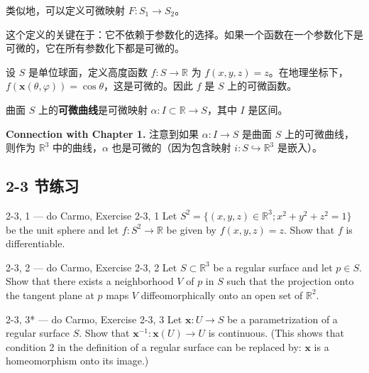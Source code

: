 类似地，可以定义可微映射 $F: S_1 \to S_2$。

\begin{Remark}
这个定义的关键在于：它不依赖于参数化的选择。如果一个函数在一个参数化下是可微的，它在所有参数化下都是可微的。
\end{Remark}

\begin{Example}[高度函数]\label{ex:height-function}
设 $S$ 是单位球面，定义高度函数 $f: S \to \mathbb{R}$ 为 $f(x,y,z) = z$。在地理坐标下，$f(\mathbf{x}(\theta,\varphi)) = \cos\theta$，这是可微的。因此 $f$ 是 $S$ 上的可微函数。
\end{Example}

\begin{Definition}[可微曲线]\label{def:differentiable-curve-on-surface}
曲面 $S$ 上的\textbf{可微曲线}是可微映射 $\alpha: I \subset \mathbb{R} \to S$，其中 $I$ 是区间。
\end{Definition}

\textbf{Connection with Chapter 1.} 注意到如果 $\alpha: I \to S$ 是曲面 $S$ 上的可微曲线，则作为 $\mathbb{R}^3$ 中的曲线，$\alpha$ 也是可微的（因为包含映射 $i: S \hookrightarrow \mathbb{R}^3$ 是嵌入）。

\subsection*{2-3 节练习}

\begin{exercise}{2-3, 1 — do Carmo, Exercise 2-3, 1}
Let $S^2 = \{(x,y,z) \in \mathbb{R}^3; x^2 + y^2 + z^2 = 1\}$ be the unit sphere and let $f: S^2 \to \mathbb{R}$ be given by $f(x,y,z) = z$. Show that $f$ is differentiable.
\end{exercise}

\begin{exercise}{2-3, 2 — do Carmo, Exercise 2-3, 2}
Let $S \subset \mathbb{R}^3$ be a regular surface and let $p \in S$. Show that there exists a neighborhood $V$ of $p$ in $S$ such that the projection onto the tangent plane at $p$ maps $V$ diffeomorphically onto an open set of $\mathbb{R}^2$.
\end{exercise}

\begin{exercise}{2-3, 3* — do Carmo, Exercise 2-3, 3}
Let $\mathbf{x}: U \to S$ be a parametrization of a regular surface $S$. Show that $\mathbf{x}^{-1}: \mathbf{x}(U) \to U$ is continuous. (This shows that condition 2 in the definition of a regular surface can be replaced by: $\mathbf{x}$ is a homeomorphism onto its image.)
\end{exercise}

